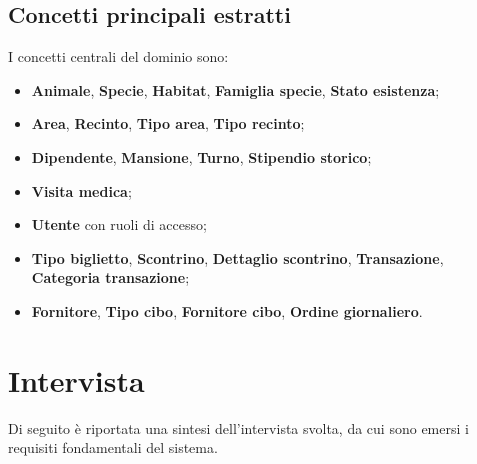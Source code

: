 \documentclass[12pt,a4paper]{report}
\begin{document}
\subsection*{Concetti principali estratti}

I concetti centrali del dominio sono:
\begin{itemize}[itemsep=2pt]
    \item \textbf{Animale}, \textbf{Specie}, \textbf{Habitat}, \textbf{Famiglia specie}, \textbf{Stato esistenza};
    \item \textbf{Area}, \textbf{Recinto}, \textbf{Tipo area}, \textbf{Tipo recinto};
    \item \textbf{Dipendente}, \textbf{Mansione}, \textbf{Turno}, \textbf{Stipendio storico};
    \item \textbf{Visita medica};
    \item \textbf{Utente} con ruoli di accesso;
    \item \textbf{Tipo biglietto}, \textbf{Scontrino}, \textbf{Dettaglio scontrino}, \textbf{Transazione}, \textbf{Categoria transazione};
    \item \textbf{Fornitore}, \textbf{Tipo cibo}, \textbf{Fornitore cibo}, \textbf{Ordine giornaliero}.
\end{itemize}


%
\section{Intervista}


Di seguito è riportata una sintesi dell'intervista svolta, da cui
sono emersi i requisiti fondamentali del sistema.
\end{document}
